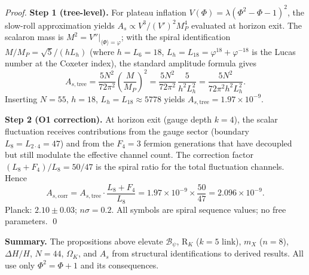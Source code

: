 \documentclass[12pt,a4paper]{article}
\begin{document}
\begin{proof}
\textbf{Step 1 (tree-level).} For plateau inflation $V(\Phi) = \lambda(\Phi^2 - \Phi - 1)^2$, the slow-roll approximation yields $A_s \propto V^3/(V')^2 M_P^4$ evaluated at horizon exit. The scalaron mass is $M^2 = V''|_{\langle\Phi\rangle=\varphi}$; with the spiral identification $M/M_P = \sqrt{5}/(h L_h)$ (where $h = L_6 = 18$, $L_h = L_{18} = \varphi^{18} + \varphi^{-18}$ is the Lucas number at the Coxeter index), the standard amplitude formula gives
\begin{equation}
A_{s,\mathrm{tree}} = \frac{5N^2}{72\pi^2}\left(\frac{M}{M_P}\right)^2 = \frac{5N^2}{72\pi^2}\, \frac{5}{h^2 L_h^2} = \frac{5N^2}{72\pi^2 h^2 L_h^2}.
\end{equation}
Inserting $N = 55$, $h = 18$, $L_h = L_{18} \approx 5778$ yields $A_{s,\mathrm{tree}} = 1.97 \times 10^{-9}$.

\textbf{Step 2 (O1 correction).} At horizon exit (gauge depth $k = 4$), the scalar fluctuation receives contributions from the gauge sector (boundary $L_8 = L_{2\cdot 4} = 47$) and from the $F_4 = 3$ fermion generations that have decoupled but still modulate the effective channel count. The correction factor $(L_8 + F_4)/L_8 = 50/47$ is the spiral ratio for the total fluctuation channels. Hence
\begin{equation}
A_{s,\mathrm{corr}} = A_{s,\mathrm{tree}} \cdot \frac{L_8 + F_4}{L_8} = 1.97 \times 10^{-9} \times \frac{50}{47} = 2.096 \times 10^{-9}.
\end{equation}
Planck: $2.10 \pm 0.03$; $n\sigma = 0.2$. All symbols are spiral sequence values; no free parameters. \qed
\end{proof}

\noindent\textbf{Summary.} The propositions above elevate $\mathcal{B}_\psi$, R$_K$ ($k=5$ link), $m_X$ ($n=8$), $\Delta H/H$, $N=44$, $\Omega_K$, and $A_s$ from structural identifications to derived results. All use only $\Phi^2 = \Phi + 1$ and its consequences.
\end{document}
